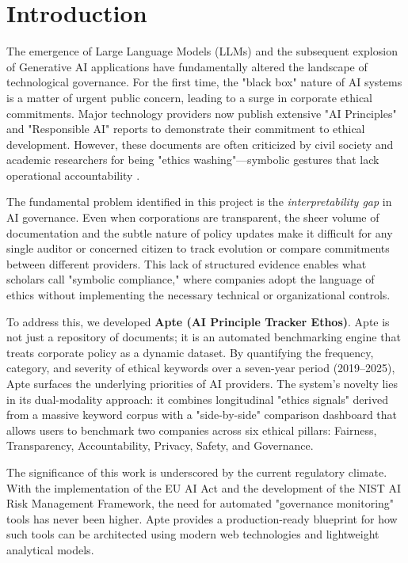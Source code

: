 \documentclass[conference]{IEEEtran}
\begin{document}
\section{Introduction}

The emergence of Large Language Models (LLMs) and the subsequent explosion of Generative AI applications have fundamentally altered the landscape of technological governance. For the first time, the "black box" nature of AI systems is a matter of urgent public concern, leading to a surge in corporate ethical commitments. Major technology providers now publish extensive "AI Principles" and "Responsible AI" reports to demonstrate their commitment to ethical development. However, these documents are often criticized by civil society and academic researchers for being "ethics washing"—symbolic gestures that lack operational accountability \cite{munn2022uselessness}.

The fundamental problem identified in this project is the \textit{interpretability gap} in AI governance. Even when corporations are transparent, the sheer volume of documentation and the subtle nature of policy updates make it difficult for any single auditor or concerned citizen to track evolution or compare commitments between different providers. This lack of structured evidence enables what scholars call "symbolic compliance," where companies adopt the language of ethics without implementing the necessary technical or organizational controls.

To address this, we developed \textbf{Apte (AI Principle Tracker Ethos)}. Apte is not just a repository of documents; it is an automated benchmarking engine that treats corporate policy as a dynamic dataset. By quantifying the frequency, category, and severity of ethical keywords over a seven-year period (2019–2025), Apte surfaces the underlying priorities of AI providers. The system’s novelty lies in its dual-modality approach: it combines longitudinal "ethics signals" derived from a massive keyword corpus with a "side-by-side" comparison dashboard that allows users to benchmark two companies across six ethical pillars: Fairness, Transparency, Accountability, Privacy, Safety, and Governance.

The significance of this work is underscored by the current regulatory climate. With the implementation of the EU AI Act and the development of the NIST AI Risk Management Framework, the need for automated "governance monitoring" tools has never been higher. Apte provides a production-ready blueprint for how such tools can be architected using modern web technologies and lightweight analytical models.
\end{document}
